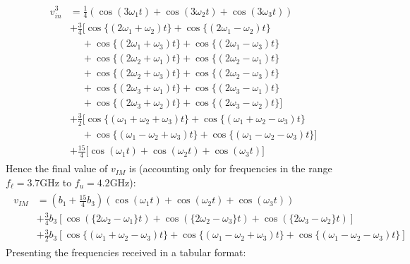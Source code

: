 \documentclass[titlepage]{article}
\begin{document}
\begin{align}
    \begin{split}
        v_{in}^3 &= \frac 14 \left(\cos(3\omega_1t)+\cos(3\omega_2t)+\cos(3\omega_3t)\right) \\
        & + \frac 34 \big[\cos\{(2\omega_1+\omega_2)t\}+\cos\{(2\omega_1-\omega_2)t\}\\&\ \quad + \cos\{(2\omega_1+\omega_3)t\}+ \cos\{(2\omega_1-\omega_3)t\}\\&\ \quad + \cos\{(2\omega_2+\omega_1)t\}+ \cos\{(2\omega_2-\omega_1)t\}\\&\ \quad + \cos\{(2\omega_2+\omega_3)t\}+ \cos\{(2\omega_2-\omega_3)t\}\\&\ \quad + \cos\{(2\omega_3+\omega_1)t\}+ \cos\{(2\omega_3-\omega_1)t\}\\&\ \quad + \cos\{(2\omega_3+\omega_2)t\}+ \cos\{(2\omega_3-\omega_2)t\}  \big] \\
        & + \frac 32 \big[\cos\{(\omega_1+\omega_2+\omega_3)t\}+\cos\{(\omega_1+\omega_2-\omega_3)t\}\\&\ \quad  +\cos\{(\omega_1-\omega_2+\omega_3)t\}+\cos\{(\omega_1-\omega_2-\omega_3)t\}\big] \\
        & + \frac {15}{4} \big[\cos(\omega_1t)+\cos(\omega_2t)+\cos(\omega_3t)\big]
    \end{split}
\end{align}
Hence the final value of $v_{IM}$ is (accounting only for frequencies in the range $f_{\ell} = 3.7$GHz to $f_u = 4.2$GHz):
\begin{align}
    \begin{split}
        v_{IM} &= \left(b_1+\frac{15}{4}b_3\right)\left(\cos(\omega_1t)+\cos(\omega_2t)+\cos(\omega_3t)\right) \\
        & + \frac 34 b_3 \left[\cos(\{2\omega_2-\omega_1\}t)+\cos(\{2\omega_2-\omega_3\}t)+\cos(\{2\omega_3-\omega_2\}t)\right] \\
        & + \frac 32 b_3 \left[\cos\{(\omega_1+\omega_2-\omega_3)t\}+\cos\{(\omega_1-\omega_2+\omega_3)t\}+\cos\{(\omega_1-\omega_2-\omega_3)t\}\right]
    \end{split}
\end{align}
Presenting the frequencies received in a tabular format:
\end{document}
